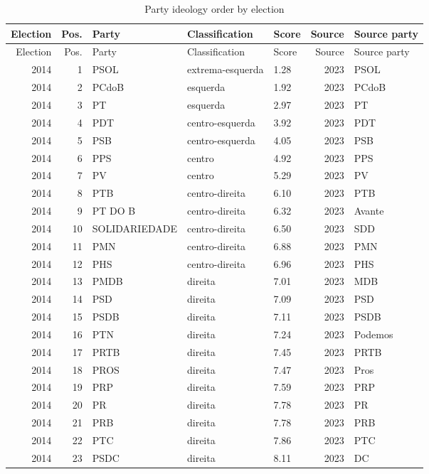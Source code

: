 \begin{longtable}{rrlllrl}
\caption{Party ideology order by election}\label{tab:ideology-order-full}\\
\toprule
Election & Pos. & Party & Classification & Score & Source & Source party \\
\midrule
\endfirsthead
\toprule
Election & Pos. & Party & Classification & Score & Source & Source party \\
\midrule
\endhead
2014 & 1 & PSOL & extrema-esquerda & 1.28 & 2023 & PSOL \\
2014 & 2 & PCdoB & esquerda & 1.92 & 2023 & PCdoB \\
2014 & 3 & PT & esquerda & 2.97 & 2023 & PT \\
2014 & 4 & PDT & centro-esquerda & 3.92 & 2023 & PDT \\
2014 & 5 & PSB & centro-esquerda & 4.05 & 2023 & PSB \\
2014 & 6 & PPS & centro & 4.92 & 2023 & PPS \\
2014 & 7 & PV & centro & 5.29 & 2023 & PV \\
2014 & 8 & PTB & centro-direita & 6.10 & 2023 & PTB \\
2014 & 9 & PT DO B & centro-direita & 6.32 & 2023 & Avante \\
2014 & 10 & SOLIDARIEDADE & centro-direita & 6.50 & 2023 & SDD \\
2014 & 11 & PMN & centro-direita & 6.88 & 2023 & PMN \\
2014 & 12 & PHS & centro-direita & 6.96 & 2023 & PHS \\
2014 & 13 & PMDB & direita & 7.01 & 2023 & MDB \\
2014 & 14 & PSD & direita & 7.09 & 2023 & PSD \\
2014 & 15 & PSDB & direita & 7.11 & 2023 & PSDB \\
2014 & 16 & PTN & direita & 7.24 & 2023 & Podemos \\
2014 & 17 & PRTB & direita & 7.45 & 2023 & PRTB \\
2014 & 18 & PROS & direita & 7.47 & 2023 & Pros \\
2014 & 19 & PRP & direita & 7.59 & 2023 & PRP \\
2014 & 20 & PR & direita & 7.78 & 2023 & PR \\
2014 & 21 & PRB & direita & 7.78 & 2023 & PRB \\
2014 & 22 & PTC & direita & 7.86 & 2023 & PTC \\
2014 & 23 & PSDC & direita & 8.11 & 2023 & DC \\

\end{longtable}
